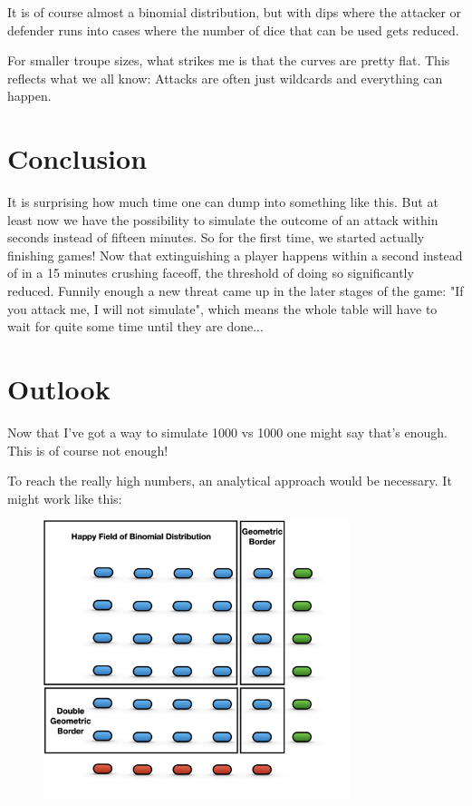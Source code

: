 \documentclass[11pt,a4paper]{article}
\begin{document}
    It is of course almost a binomial distribution, but with dips where the attacker or defender runs into cases where the number of dice that can be used gets reduced.

    For smaller troupe sizes, what strikes me is that the curves are pretty flat.
    This reflects what we all know: Attacks are often just wildcards and everything can happen.


    \section{Conclusion}
    It is surprising how much time one can dump into something like this.
    But at least now we have the possibility to simulate the outcome of an attack within seconds instead of fifteen minutes. So for the first time, we started actually finishing games! Now that extinguishing a player happens within a second instead of in a 15 minutes crushing faceoff, the threshold of doing so significantly reduced. Funnily enough a new threat came up in the later stages of the game: "If you attack me, I will not simulate", which means the whole table will have to wait for quite some time until they are done...


    \section{Outlook}
    Now that I've got a way to simulate 1000 vs 1000 one might say that's enough.
    This is of course not enough!

    To reach the really high numbers, an analytical approach would be necessary.
    It might work like this:

    \begin{figure}[H]
        \centering
        \includegraphics[width=0.8\textwidth]{../images/Analytic Interpolation.png}
    \end{figure}
\end{document}

